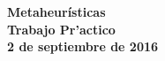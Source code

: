 \documentclass[11pt,a4paper]{article}
\begin{document}
\parskip=5pt

\thispagestyle{empty}

\def\Materia{Metaheurísticas}
\def\Titulo{Trabajo Pr'actico}
\def\Fecha{2 de septiembre de 2016}

\begin{center}
    {\LARGE\textbf{\Materia}}\\[1em]    
    \vspace{5mm}
    {\Large \textbf{\Titulo}}\\[1em]
    \vspace{2mm}
    {\textbf{\large \Fecha}}\\
    \vspace{5mm}
    \textbf{\tablaints}
\end{center}

\tableofcontents

\newpage

\pagestyle{headings}
\setcounter{page}{1}

%





\end{document}
